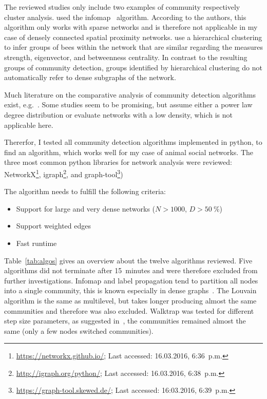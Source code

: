 The reviewed studies only include two examples of community respectively cluster analysis. \textcite{mersch2013tracking} used the infomap~\cite{rosvall2009map,rosvall2007information} algorithm. According to the authors, this algorithm only works with sparse networks and is therefore not applicable in my case of densely connected spatial proximity networks. \textcite{baracchi2014socio} use a hierarchical clustering to infer groups of bees within the network that are similar regarding the measures strength, eigenvector, and betweenness centrality. In contrast to the resulting groups of community detection, groups identified by hierarchical clustering do not automatically refer to dense subgraphs of the network.

Much literature on the comparative analysis of community detection algorithms exist, e.g.~\cite{yang2016comparative, harenberg2014community}. Some studies seem to be promising, but assume either a power law degree distribution or
evaluate networks with a low density, which is not applicable here.

Thererfor, I tested all community detection algorithms implemented in python, to find an algorithm, which works well for my case of animal social networks. The three most common python libraries for network analysis were reviewed: NetworkX\footnote{\url{https://networkx.github.io/}; Last accessed: 16.03.2016, 6:36~p.m.}, igraph\footnote{\url{http://igraph.org/python/}; Last accessed: 16.03.2016, 6:38~p.m.}, and graph-tool\footnote{\url{https://graph-tool.skewed.de/}; Last accessed: 16:03.2016, 6:39~p.m.})

The algorithm needs to fulfill the following criteria:

\begin{itemize}
\item Support for large and very dense networks ($N>1000$, $D>50~\%$)
\item Support weighted edges
\item Fast runtime
\end{itemize}

Table~\ref{tab:algos} gives an overview about the twelve algorithms reviewed. Five algorithms did not terminate after 15~minutes and were therefore excluded from further investigations. Infomap and label propagation tend to partition all nodes into a single community, this is known especially in dense graphs~\cite{yang2016comparative, fortunato2010community}.
The Louvain algorithm is the same as multilevel, but takes longer producing almost the same communities and therefore was also excluded. Walktrap was tested for different step size parameters, as suggested in~\cite{pons2005computing}, the communities remained almost the same (only a few nodes switched communities). 

